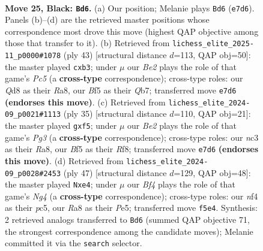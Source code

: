 \documentclass[11pt]{article}
\begin{document}
\clearpage

\begin{figure}[p]\centering
\begin{subfigure}{0.46\textwidth}\centering
\resizebox{\linewidth}{!}{%
\newchessgame
\chessboard[
  setfen={r2q3r/ppp1b1k1/5pp1/3P1b1p/Pnp1RN2/2N3P1/RPP1QP1P/2B3K1 b - - 4 25},
  showmover=false,
  pgfstyle=straightmove, color=movearrow, markmove={e7-d6}
]}
\caption{}
\end{subfigure}\hfill
\begin{subfigure}{0.46\textwidth}\centering
\resizebox{\linewidth}{!}{%
\newchessgame
\chessboard[
  setfen={r2r2k1/1q2ppb1/p6p/3bP1pn/Q1p5/1P2BN1P/P1RN1PP1/2R3K1 b - - 0 22},
  showmover=false,
  pgfstyle=straightmove, color=movearrow, markmove={c4-b3}
]}
\caption{}
\end{subfigure}
\\[4pt]
\begin{subfigure}{0.46\textwidth}\centering
\resizebox{\linewidth}{!}{%
\newchessgame
\chessboard[
  setfen={r3qrk1/2pb2bp/3p2p1/p1pPpP1n/P1N5/R1N3PP/1PP2P2/3QRBK1 b - - 0 18},
  showmover=false,
  pgfstyle=straightmove, color=movearrow, markmove={g6-f5}
]}
\caption{}
\end{subfigure}\hfill
\begin{subfigure}{0.46\textwidth}\centering
\resizebox{\linewidth}{!}{%
\newchessgame
\chessboard[
  setfen={r2q1r2/1pp3k1/3p1bp1/P1PPpbnp/4N3/1N1B3P/2Q2PP1/R3R1K1 b - - 0 24},
  showmover=false,
  pgfstyle=straightmove, color=movearrow, markmove={g5-e4}
]}
\caption{}
\end{subfigure}
\caption{\textbf{Move 25, Black: \texttt{Bd6}.} (a) Our position; Melanie plays \texttt{Bd6} (\texttt{e7d6}). Panels (b)--(d) are the retrieved master positions whose correspondence most drove this move (highest QAP objective among those that transfer to it). (b) Retrieved from \texttt{lichess\_elite\_2025-11\_p0000\#1078} (ply 43) [structural distance $d$=113, QAP obj=50]: the master played \texttt{cxb3}; under $\mu$ our \emph{Be2} plays the role of that game's \emph{Pc5} (a \textbf{cross-type} correspondence); cross-type roles: our \emph{Q}d8 as their \emph{R}a8, our \emph{B}f5 as their \emph{Q}b7; transferred move \texttt{e7d6} \textbf{(endorses this move)}. (c) Retrieved from \texttt{lichess\_elite\_2024-09\_p0021\#1113} (ply 35) [structural distance $d$=110, QAP obj=21]: the master played \texttt{gxf5}; under $\mu$ our \emph{Be2} plays the role of that game's \emph{Pg3} (a \textbf{cross-type} correspondence); cross-type roles: our \emph{n}c3 as their \emph{R}a8, our \emph{B}f5 as their \emph{R}f8; transferred move \texttt{e7d6} \textbf{(endorses this move)}. (d) Retrieved from \texttt{lichess\_elite\_2024-09\_p0028\#2453} (ply 47) [structural distance $d$=129, QAP obj=48]: the master played \texttt{Nxe4}; under $\mu$ our \emph{Bf4} plays the role of that game's \emph{Ng4} (a \textbf{cross-type} correspondence); cross-type roles: our \emph{n}f4 as their \emph{p}c5, our \emph{R}a8 as their \emph{P}e5; transferred move \texttt{f5e4}. Synthesis: 2 retrieved analogs transferred to \texttt{Bd6} (summed QAP objective 71, the strongest correspondence among the candidate moves); Melanie committed it via the \texttt{search} selector.}

\end{figure}
\end{document}
